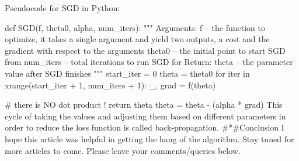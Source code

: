 Pseudocode for SGD in Python: 

def SGD(f, theta0, alpha, num_iters):
    """
       Arguments:
       f -- the function to optimize, it takes a single argument
            and yield two outputs, a cost and the gradient
            with respect to the arguments
       theta0 -- the initial point to start SGD from
       num_iters -- total iterations to run SGD for
       Return:
       theta -- the parameter value after SGD finishes
    """
    start_iter = 0
    theta = theta0
    for iter in xrange(start_iter + 1, num_iters + 1):
        _, grad = f(theta)
  
        # there is NO dot product ! return theta
        theta = theta - (alpha * grad)
This cycle of taking the values and adjusting them based on different parameters in order to reduce the loss function is called back-propagation.
#*#Conclusion
I hope this article was helpful in getting the hang of the algorithm. Stay tuned for more articles to come. Please leave your comments/queries below.


